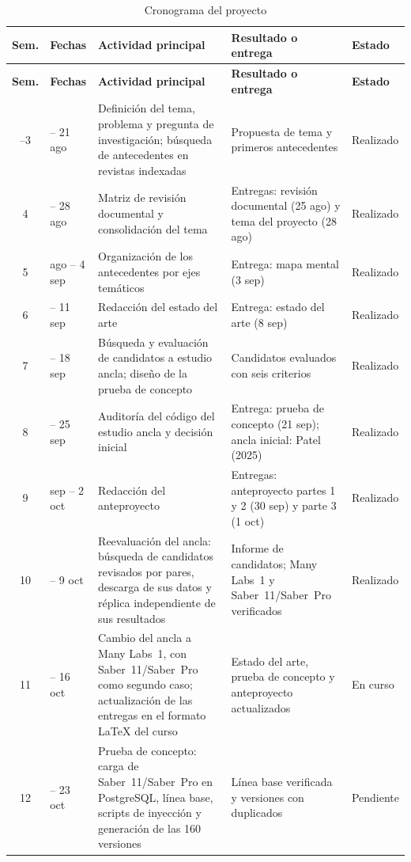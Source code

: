 \documentclass[11pt,openany,oneside,letterpaper]{book}
\begin{document}
{\small
\setlength{\tabcolsep}{4pt}
\begin{longtable}{c >{\raggedright\arraybackslash}p{1.8cm} >{\raggedright\arraybackslash}p{4.6cm} >{\raggedright\arraybackslash}p{4.3cm} >{\raggedright\arraybackslash}p{1.5cm}}
\caption{Cronograma del proyecto}\label{tab:cronograma}\\
\toprule
\textbf{Sem.} & \textbf{Fechas} & \textbf{Actividad principal} & \textbf{Resultado o entrega} & \textbf{Estado} \\
\midrule
\endfirsthead
\toprule
\textbf{Sem.} & \textbf{Fechas} & \textbf{Actividad principal} & \textbf{Resultado o entrega} & \textbf{Estado} \\
\midrule
\endhead
\bottomrule
\endfoot
1--3 & 3 -- 21 ago & Definición del tema, problema y pregunta de investigación; búsqueda de antecedentes en revistas indexadas & Propuesta de tema y primeros antecedentes & Realizado \\
4 & 24 -- 28 ago & Matriz de revisión documental y consolidación del tema & Entregas: revisión documental (25 ago) y tema del proyecto (28 ago) & Realizado \\
5 & 31 ago -- 4 sep & Organización de los antecedentes por ejes temáticos & Entrega: mapa mental (3 sep) & Realizado \\
6 & 7 -- 11 sep & Redacción del estado del arte & Entrega: estado del arte (8 sep) & Realizado \\
7 & 14 -- 18 sep & Búsqueda y evaluación de candidatos a estudio ancla; diseño de la prueba de concepto & Candidatos evaluados con seis criterios & Realizado \\
8 & 21 -- 25 sep & Auditoría del código del estudio ancla y decisión inicial & Entrega: prueba de concepto (21 sep); ancla inicial: Patel (2025) & Realizado \\
9 & 28 sep -- 2 oct & Redacción del anteproyecto & Entregas: anteproyecto partes 1 y 2 (30 sep) y parte 3 (1 oct) & Realizado \\
10 & 5 -- 9 oct & Reevaluación del ancla: búsqueda de candidatos revisados por pares, descarga de sus datos y réplica independiente de sus resultados & Informe de candidatos; Many Labs~1 y Saber~11/Saber~Pro verificados & Realizado \\
11 & 13 -- 16 oct & Cambio del ancla a Many Labs~1, con Saber~11/Saber~Pro como segundo caso; actualización de las entregas en el formato \LaTeX{} del curso & Estado del arte, prueba de concepto y anteproyecto actualizados & En curso \\
12 & 19 -- 23 oct & Prueba de concepto: carga de Saber~11/Saber~Pro en PostgreSQL, línea base, scripts de inyección y generación de las 160 versiones & Línea base verificada y versiones con duplicados & Pendiente \\

\end{longtable}}
\end{document}
